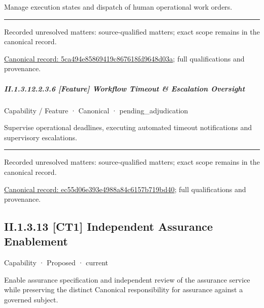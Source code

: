 Manage execution states and dispatch of human operational work orders.



\medskip\hrule\medskip

{\small Recorded unresolved matters: source-qualified matters; exact scope remains in the canonical record.}\par
{\footnotesize \href{../../../../continuum/strategy/capability/feature/5ca494e85869419c867618fd9648d03a.md}{Canonical record: 5ca494e85869419c867618fd9648d03a}; full qualifications and provenance.}\par
\subparagraph*{II.1.3.12.2.3.6 [Feature] Workflow Timeout \& Escalation Oversight}
\label{navigation:II.1.3.12.2.3.6}

\label{element:ec55d06e393e4988a84c6157b719bd40}
{\small Capability / Feature · Canonical · pending\_adjudication}\par

Supervise operational deadlines, executing automated timeout notifications and supervisory escalations.



\medskip\hrule\medskip

{\small Recorded unresolved matters: source-qualified matters; exact scope remains in the canonical record.}\par
{\footnotesize \href{../../../../continuum/strategy/capability/feature/ec55d06e393e4988a84c6157b719bd40.md}{Canonical record: ec55d06e393e4988a84c6157b719bd40}; full qualifications and provenance.}\par
\subsection*{II.1.3.13 [CT1] Independent Assurance Enablement}
\label{navigation:II.1.3.13}

\label{element:616682b612d244429e656b040e002d56}
{\small Capability · Proposed · current}\par

Enable assurance specification and independent review of the assurance service while preserving the distinct Canonical responsibility for assurance against a governed subject.



